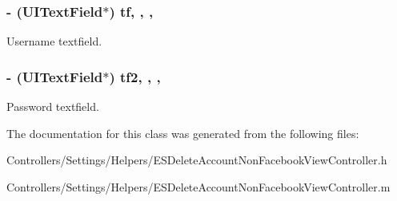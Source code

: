 \subsubsection[{tf}]{\setlength{\rightskip}{0pt plus 5cm}-\/ (U\+I\+Text\+Field$\ast$) tf\hspace{0.3cm}{\ttfamily [read]}, {\ttfamily [write]}, {\ttfamily [nonatomic]}, {\ttfamily [strong]}}\label{interface_e_s_delete_account_non_facebook_view_controller_afce770d81c796ef6e625e2ff379de008}
Username textfield. \hypertarget{interface_e_s_delete_account_non_facebook_view_controller_a5a7102be99dd08d7efe83c7a1ac163ca}{}
\subsubsection[{tf2}]{\setlength{\rightskip}{0pt plus 5cm}-\/ (U\+I\+Text\+Field$\ast$) tf2\hspace{0.3cm}{\ttfamily [read]}, {\ttfamily [write]}, {\ttfamily [nonatomic]}, {\ttfamily [strong]}}\label{interface_e_s_delete_account_non_facebook_view_controller_a5a7102be99dd08d7efe83c7a1ac163ca}
Password textfield. 

The documentation for this class was generated from the following files\+:\begin{DoxyCompactItemize}
\item 
Controllers/\+Settings/\+Helpers/E\+S\+Delete\+Account\+Non\+Facebook\+View\+Controller.\+h\item 
Controllers/\+Settings/\+Helpers/E\+S\+Delete\+Account\+Non\+Facebook\+View\+Controller.\+m\end{DoxyCompactItemize}
